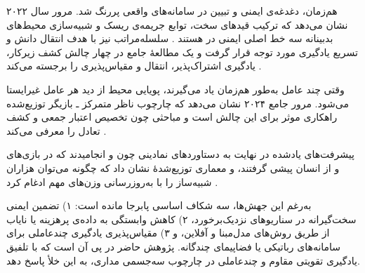 \noindent
هم‌زمان، دغدغه‌ی ایمنی و تبیین در سامانه‌های واقعی پررنگ شد. مرور سال ۲۰۲۲ نشان می‌دهد که ترکیب قیدهای سخت، توابع جریمه‌ی ریسک و شبیه‌سازی محیط‌های بدبینانه سه خط اصلی ایمنی در  هستند \cite{Garcia2022SafeSurvey}. سلسله‌مراتب نیز با هدف انتقال دانش و تسریع یادگیری مورد توجه قرار گرفت و یک مطالعهٔ جامع در 
 چهار چالش کشف زیرکار، یادگیری اشتراک‌پذیر، انتقال و مقیاس‌پذیری را برجسته می‌کند \cite{Ghazalpour2021HRLsurvey}. %

\noindent
وقتی چند عامل به‌طور هم‌زمان یاد می‌گیرند، پویایی محیط از دید هر عامل غیرایستا می‌شود. مرور جامع ۲۰۲۴ نشان می‌دهد که چارچوب ناظر متمرکز ـ بازیگر توزیع‌شده
 راهکاری موثر برای این چالش است و مباحثی چون تخصیص اعتبار جمعی و کشف تعادل را معرفی می‌کند \cite{Song2024MARLsurvey}. %

\noindent
پیشرفت‌های یادشده در نهایت به دستاوردهای نمادینی چون  \cite{Silver2016AlphaGo} و  \cite{Vinyals2019AlphaStar} انجامیدند که در بازی‌های  و  از انسان پیشی گرفتند، و معماری توزیع‌شدهٔ  نشان داد که چگونه می‌توان هزاران شبیه‌ساز را با به‌روزرسانی وزن‌های مهم ادغام کرد \cite{Espeholt2018IMPALA}. %

\noindent
به‌رغم این جهش‌ها، سه شکاف اساسی پابرجا مانده است: ۱) تضمین ایمنی سخت‌گیرانه در سناریوهای نزدیک‌برخورد، ۲) کاهش وابستگی به داده‌ی پرهزینه یا نایاب از طریق روش‌های مدل‌مبنا و آفلاین، و ۳) مقیاس‌پذیری یادگیری چندعاملی برای سامانه‌های رباتیکی یا فضاپیمای چندگانه. پژوهش حاضر در پی آن است که با تلفیق یادگیری تقویتی مقاوم و چندعاملی در چارچوب سه‌جسمی مداری، به این خلأ پاسخ دهد.
